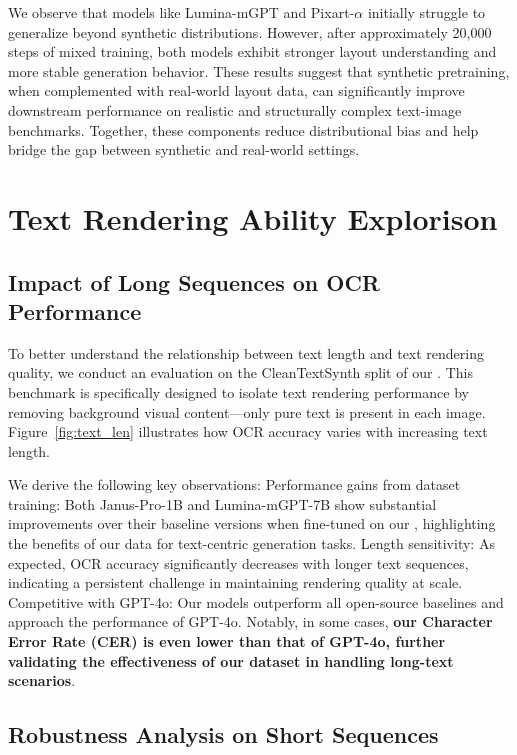 We observe that models like Lumina-mGPT and Pixart-$\alpha$ initially struggle to generalize beyond synthetic distributions. However, after approximately 20,000 steps of mixed training, both models exhibit stronger layout understanding and more stable generation behavior. These results suggest that synthetic pretraining, when complemented with real-world layout data, can significantly improve downstream performance on realistic and structurally complex text-image benchmarks. Together, these components reduce distributional bias and help bridge the gap between synthetic and real-world settings.


\section{Text Rendering Ability Explorison}



\subsection{Impact of Long Sequences on OCR Performance}

To better understand the relationship between text length and text rendering quality, we conduct an evaluation on the CleanTextSynth split of our \EvalDatasetName. This benchmark is specifically designed to isolate text rendering performance by removing background visual content—only pure text is present in each image. Figure~\ref{fig:text_len} illustrates how OCR accuracy varies with increasing text length.



We derive the following key observations:
Performance gains from dataset training: Both Janus-Pro-1B and Lumina-mGPT-7B show substantial improvements over their baseline versions when fine-tuned on our \DatasetName, highlighting the benefits of our data for text-centric generation tasks.
Length sensitivity: As expected, OCR accuracy significantly decreases with longer text sequences, indicating a persistent challenge in maintaining rendering quality at scale.
Competitive with GPT-4o: Our models outperform all open-source baselines and approach the performance of GPT-4o. Notably, in some cases, \textbf{our Character Error Rate (CER) is even lower than that of GPT-4o, further validating the effectiveness of our dataset in handling long-text scenarios}.



\subsection{Robustness Analysis on Short Sequences}

